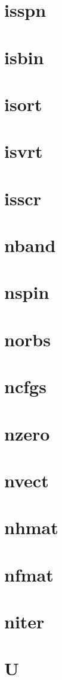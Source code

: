 \documentclass[10pt]{book}
\begin{document}
\section{isspn}
\section{isbin}
\section{isort}
\section{isvrt}
\section{isscr}
\section{nband}
\section{nspin}
\section{norbs}
\section{ncfgs}
\section{nzero}
\section{nvect}
\section{nhmat}
\section{nfmat}
\section{niter}
\section{U}
\end{document}

